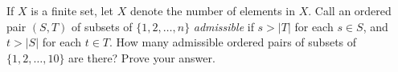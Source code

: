 If $X$ is a finite set, let $X$ denote the number of elements
in $X$. Call an ordered pair $(S, T)$ of subsets of $\{1, 2, \dots, n\}$
{\em admissible} if $s > |T|$ for each $s \in S$, and $t > |S|$ for each
$t \in T$. How many admissible ordered pairs of subsets of $\{1, 2,
\dots, 10\}$ are there? Prove your answer.
